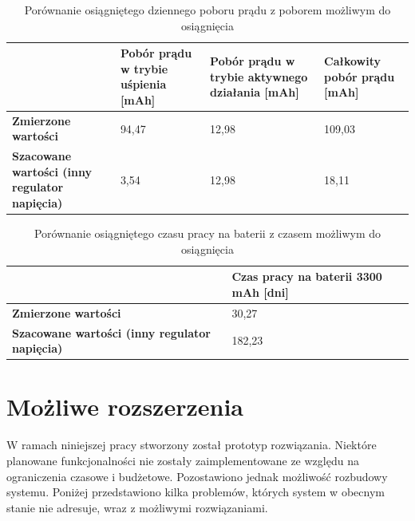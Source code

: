         \begin{table}[]
            \centering
            \caption{Porównanie osiągniętego dziennego poboru prądu z poborem możliwym do osiągnięcia}
            \begin{tabular}{p{4cm}|p{3cm}|p{3cm}|p{3cm} }
                    & \textbf{Pobór prądu w trybie uśpienia [mAh]} & \textbf{Pobór prądu w trybie aktywnego działania [mAh]} & \textbf{Całkowity pobór prądu [mAh]} \\ \hline
             \textbf{Zmierzone wartości}
                      & 94,47 & 12,98 & 109,03 \\
            \hline
            \textbf{Szacowane wartości (inny regulator napięcia)} &  3,54 & 12,98 & 18,11 \\
            \end{tabular}
            \label{tbl:tab2}
            \vspace{10mm}           
        \end{table}

        \begin{table}[]
            \caption{Porównanie osiągniętego czasu pracy na baterii z czasem możliwym do osiągnięcia}
            \centering
            \begin{tabular}{p{}|p{}}
                    & \textbf{Czas pracy na baterii 3300 mAh [dni]} \\ \hline
             \textbf{Zmierzone wartości}
                      & 30,27 \\
            \hline
            \textbf{Szacowane wartości (inny regulator napięcia)} &  182,23  \\
            \end{tabular}
            \label{tbl:tab3}
            \vspace{10mm}           
        \end{table}

	\section{Możliwe rozszerzenia}

        W ramach niniejszej pracy stworzony został prototyp rozwiązania. Niektóre planowane funkcjonalności nie zostały zaimplementowane ze względu na ograniczenia czasowe i budżetowe. Pozostawiono jednak możliwość rozbudowy systemu. Poniżej przedstawiono kilka problemów, których system w obecnym stanie nie adresuje, wraz z możliwymi rozwiązaniami.

